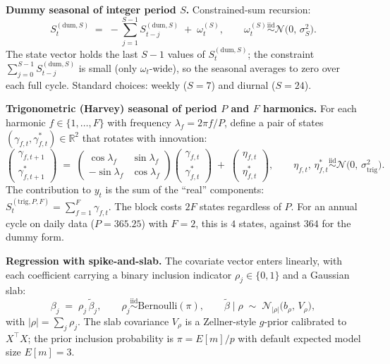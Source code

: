 \documentclass[11pt,a4paper]{article}
\begin{document}
\medskip
\noindent\textbf{Dummy seasonal of integer period $S$.} Constrained-sum recursion:
\begin{equation}
S_t^{(\text{dum},S)} \;=\; -\sum_{j=1}^{S-1} S_{t-j}^{(\text{dum},S)} \;+\; \omega_t^{(S)},
\qquad \omega_t^{(S)} \stackrel{\text{iid}}{\sim} \mathcal{N}\!\bigl(0,\, \sigma_S^2\bigr).
\label{eq:dummy_seasonal}
\end{equation}
The state vector holds the last $S{-}1$ values of $S_t^{(\text{dum},S)}$; the constraint $\sum_{j=0}^{S-1} S_{t-j}^{(\text{dum},S)}$ is small (only $\omega_t$-wide), so the seasonal averages to zero over each full cycle. Standard choices: weekly ($S=7$) and diurnal ($S=24$).

\medskip
\noindent\textbf{Trigonometric (Harvey) seasonal of period $P$ and $F$ harmonics.} For each harmonic $f \in \{1,\dots,F\}$ with frequency $\lambda_f = 2\pi f / P$, define a pair of states $(\gamma_{f,t}, \gamma_{f,t}^{\ast}) \in \mathbb{R}^2$ that rotates with innovation:
\begin{equation}
\begin{pmatrix} \gamma_{f,t+1} \\[2pt] \gamma_{f,t+1}^{\ast} \end{pmatrix}
\;=\;
\begin{pmatrix} \cos\lambda_f & \sin\lambda_f \\[2pt] -\sin\lambda_f & \cos\lambda_f \end{pmatrix}
\begin{pmatrix} \gamma_{f,t} \\[2pt] \gamma_{f,t}^{\ast} \end{pmatrix}
\;+\;
\begin{pmatrix} \eta_{f,t} \\[2pt] \eta_{f,t}^{\ast} \end{pmatrix},
\qquad \eta_{f,t},\, \eta_{f,t}^{\ast} \stackrel{\text{iid}}{\sim} \mathcal{N}\!\bigl(0,\, \sigma_{\text{trig}}^2\bigr).
\label{eq:trig_seasonal}
\end{equation}
The contribution to $y_t$ is the sum of the ``real'' components: $S_t^{(\text{trig},P,F)} = \sum_{f=1}^F \gamma_{f,t}$. The block costs $2F$ states regardless of $P$. For an annual cycle on daily data ($P = 365.25$) with $F = 2$, this is $4$ states, against $364$ for the dummy form.

\medskip
\noindent\textbf{Regression with spike-and-slab.} The covariate vector enters linearly, with each coefficient carrying a binary inclusion indicator $\rho_j \in \{0,1\}$ and a Gaussian slab:
\begin{equation}
\beta_j \;=\; \rho_j\, \tilde\beta_j,
\qquad
\rho_j \stackrel{\text{iid}}{\sim} \mathrm{Bernoulli}(\pi),
\qquad
\tilde\beta \mid \rho \;\sim\; \mathcal{N}_{|\rho|}\!\bigl(b_\rho,\, V_\rho\bigr),
\label{eq:spike_slab}
\end{equation}
with $|\rho| = \sum_j \rho_j$. The slab covariance $V_\rho$ is a Zellner-style $g$-prior calibrated to $X^{\!\top}X$; the prior inclusion probability is $\pi = E[m]/p$ with default expected model size $E[m] = 3$.
\end{document}
